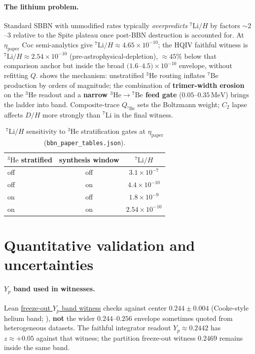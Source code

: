 \documentclass[11pt]{amsart}
\newcommand{\etap}{\ensuremath{\eta_{\mathrm{paper}}}}
\begin{document}
\paragraph{The lithium problem.}
Standard SBBN with unmodified rates typically \emph{overpredicts}
$^7\mathrm{Li}/H$ by factors $\sim 2$--$3$ relative to the Spite plateau
once post-BBN destruction is accounted for.  At \etap{} Coc semi-analytics
\cite{coc2015} give $^7\mathrm{Li}/H\approx 4.65\times10^{-10}$; the HQIV
faithful witness is $^7\mathrm{Li}/H\approx 2.54\times10^{-10}$
(pre-astrophysical-depletion), $\approx 45\%$ below that comparison anchor
but inside the broad $(1.6$--$4.5)\times10^{-10}$ envelope, without
refitting $Q$.
 shows the mechanism: unstratified $^3\mathrm{He}$ routing
inflates $^7\mathrm{Be}$ production by orders of magnitude; the combination of
\textbf{trimer-width erosion} on the $^3\mathrm{He}$ readout and a
\textbf{narrow $^3\mathrm{He}\!\to\!{}^7\mathrm{Be}$ feed gate}
($0.05$--$0.35\,\mathrm{MeV}$) brings the ladder into band.  Composite-trace
$Q_{^7\mathrm{Be}}$ sets the Boltzmann weight; $C_2$ lapse affects $D/H$ more
strongly than $^7\mathrm{Li}$ in the final witness.

\begin{table}[ht]
\centering
\caption{$^7\mathrm{Li}/H$ sensitivity to $^3\mathrm{He}$ stratification gates
at \etap{} (\texttt{bbn\_paper\_tables.json}).}
\label{tab:li7-gates}
\begin{tabular}{lcc}
\toprule
$^3\mathrm{He}$ stratified & synthesis window & $^7\mathrm{Li}/H$ \\
\midrule
off & off & $3.1\times 10^{-7}$ \\
off & on  & $4.4\times 10^{-10}$ \\
on  & off & $1.8\times 10^{-9}$ \\
on  & on  & $2.54\times 10^{-10}$ \\
\bottomrule
\end{tabular}
\end{table}

\section{Quantitative validation and uncertainties}
\label{sec:validation}

\paragraph{$Y_p$ band used in witnesses.}
Lean \hyperref[lean:bbn-yp-band]{freeze-out $Y_p$ band witness} checks against
center $0.244\pm0.004$ (Cooke-style helium band; \cite{coc2015}), \textbf{not}
the wider $0.244$--$0.256$ envelope sometimes quoted from heterogeneous
datasets.  The faithful integrator readout $Y_p\approx 0.2442$ has
$z\approx +0.05$ against that witness; the partition freeze-out witness
$0.2469$ remains inside the same band.
\end{document}
